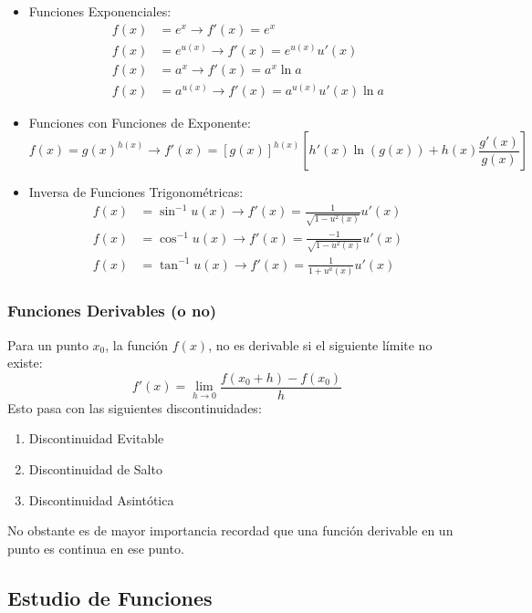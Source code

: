 \documentclass[arial,a4paper,print]{article}
\begin{document}
\begin{itemize}
\item Funciones Exponenciales:
\begin{align*}
	f(x) &= e^x \rightarrow f'(x) = e^{x} \\
	f(x) &= e^{u(x)} \rightarrow f'(x) = e^{u(x)}u'(x) \\
	f(x) &= a^{x} \rightarrow f'(x) = a^{x}\ln a \\
	f(x) &= a^{u(x)} \rightarrow f'(x) = a^{u(x)}u'(x)\ln a
\end{align*}

\item Funciones con Funciones de Exponente:
\begin{equation*}
	f(x) = g(x)^{h(x)} \rightarrow f'(x) = [g(x)]^{h(x)}\left[h'(x)\ln(g(x))+h(x)\frac{g'(x)}{g(x)}\right]
\end{equation*}

\item Inversa de Funciones Trigonométricas:
\begin{align*}
	f(x) &= \sin^{-1}u(x) \rightarrow f'(x) = \frac{1}{\sqrt{1-u^{2}(x)}}u'(x) \\
	f(x) &= \cos^{-1}u(x) \rightarrow f'(x) = \frac{-1}{\sqrt{1-u^{2}(x)}}u'(x) \\
	f(x) &= \tan^{-1}u(x) \rightarrow f'(x) = \frac{1}{1+u^{a}(x)}u'(x)
\end{align*}

\end{itemize}

\subsubsection{Funciones Derivables (o no)}
Para un punto $x_{0}$, la función $f(x)$, no es derivable si el siguiente límite no existe:
\begin{equation*}
	f'(x) = \lim_{h\rightarrow 0}\frac{f(x_{0}+ h )-f(x_{0})}{h}
\end{equation*}
Esto pasa con las siguientes discontinuidades:
\begin{enumerate}
	\item Discontinuidad Evitable
	\item Discontinuidad de Salto
	\item Discontinuidad Asintótica
\end{enumerate}

No obstante es de mayor importancia recordad que una función derivable en un punto es continua en ese punto. 

\pagebreak
\subsection{Estudio de Funciones}
\end{document}
